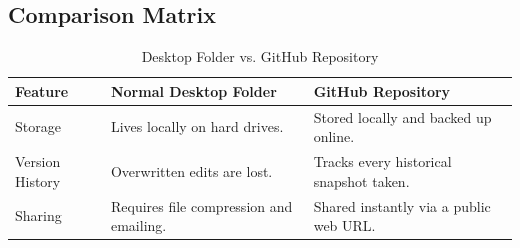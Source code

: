 \documentclass{article}
\begin{document}
\subsection{Comparison Matrix}
\begin{table}[h]
\centering
\begin{tabular}{@{}lll@{}}
\toprule
\textbf{Feature} & \textbf{Normal Desktop Folder} & \textbf{GitHub Repository} \\ \midrule
Storage & Lives locally on hard drives. & Stored locally and backed up online. \\
Version History & Overwritten edits are lost. & Tracks every historical snapshot taken. \\
Sharing & Requires file compression and emailing. & Shared instantly via a public web URL. \\ \bottomrule
\end{tabular}
\caption{Desktop Folder vs. GitHub Repository}
\end{table}
\end{document}
